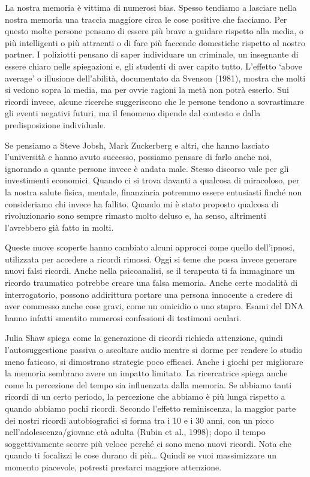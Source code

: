 \documentclass[12pt]{book} %
\begin{document}
\begin{mdframed}[linewidth=1pt]
La nostra memoria è vittima di numerosi bias. Spesso tendiamo a lasciare nella nostra memoria una traccia
maggiore circa le cose positive che facciamo. Per questo molte persone pensano di essere più brave a guidare rispetto
alla media, o più intelligenti o più attraenti o di fare più faccende domestiche rispetto al nostro partner. I
poliziotti pensano di saper individuare un criminale, un insegnante di essere chiaro nelle spiegazioni e, gli studenti di aver capito tutto. 
L’effetto ‘above average’ o illusione dell’abilità, documentato da Svenson (1981), mostra che molti si vedono sopra la media, ma per ovvie ragioni la metà non potrà esserlo.
Sui ricordi invece, alcune ricerche suggeriscono che le persone tendono a sovrastimare gli eventi negativi futuri, ma il fenomeno dipende dal contesto e dalla predisposizione individuale.

Se pensiamo a Steve Jobsh, Mark Zuckerberg e altri, che hanno lasciato l'università e hanno avuto successo, possiamo pensare di farlo
anche noi, ignorando a quante persone invece è andata male. Stesso discorso vale per gli investimenti economici. Quando
ci si trova davanti a qualcosa di miracoloso, per la nostra salute fisica, mentale, finanziaria potremmo essere
entusiasti finché non consideriamo chi invece ha fallito. Quando mi è stato proposto qualcosa di rivoluzionario sono sempre rimasto molto deluso e, ha senso, altrimenti l'avrebbero già fatto in molti.

Queste nuove scoperte hanno cambiato alcuni approcci come quello dell'ipnosi, utilizzata per accedere a ricordi rimossi.
Oggi si teme che possa invece generare nuovi falsi ricordi. 
Anche nella psicoanalisi, se il terapeuta ti fa immaginare un ricordo traumatico potrebbe creare una falsa memoria. Anche certe modalità di interrogatorio, possono addirittura portare una persona innocente a credere di
aver commesso anche cose gravi, come un omicidio o uno stupro. Esami del DNA hanno infatti smentito numerosi confessioni di testimoni oculari.

Julia Shaw spiega come la generazione di ricordi richieda attenzione, quindi l'autosuggestione
passiva o ascoltare audio mentre si dorme per rendere lo studio meno faticoso, si dimostrano strategie poco efficaci.
Anche i giochi per migliorare la memoria sembrano avere un impatto limitato. La ricercatrice spiega anche come la percezione del
tempo sia influenzata dalla memoria. Se abbiamo tanti ricordi di un certo periodo, la percezione che abbiamo è più
lunga rispetto a quando abbiamo pochi ricordi. Secondo l’effetto reminiscenza, la maggior parte dei nostri ricordi autobiografici si forma tra i 10 e i 30 anni, con un picco nell’adolescenza/giovane età adulta (Rubin et al., 1998); dopo il tempo soggettivamente scorre più veloce perché ci sono meno nuovi ricordi.
Nota che quando ti focalizzi le cose durano di più… Quindi se vuoi massimizzare un momento piacevole, potresti prestarci maggiore attenzione.
\end{mdframed}
\end{document}
